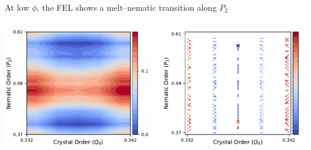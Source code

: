 \documentclass[aspectratio=169]{beamer}
\begin{document}
\begin{frame}[c]{At low $\phi$, the FEL shows a melt--nematic transition along $P_{2}$}

  \begin{columns}[T]

    \centering
    \includegraphics[width=\textwidth]{../figures/fig-pathway_10p75/subfig-pathway_10p75.pdf}

    \centering
    \includegraphics[width=\textwidth]{../figures/ch4_jcp/fig-quivers_10p75/fig-quiver_10.75.pdf}
     
  \end{columns}

\end{frame}
\end{document}
